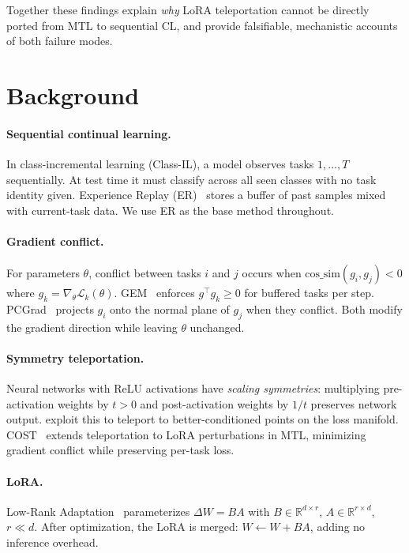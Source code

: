 \documentclass{article}
\newcommand{\cossim}{\mathrm{cos\_sim}}
\begin{document}
Together these findings explain \emph{why} LoRA teleportation cannot be directly ported
from MTL to sequential CL, and provide falsifiable, mechanistic accounts of both failure modes.

\section{Background}
\label{sec:background}

\paragraph{Sequential continual learning.}
In class-incremental learning (Class-IL), a model observes tasks $1, \ldots, T$ sequentially.
At test time it must classify across all seen classes with no task identity given.
Experience Replay (ER)~\citep{rolnick2019er} stores a buffer of past samples mixed with
current-task data. We use ER as the base method throughout.

\paragraph{Gradient conflict.}
For parameters $\theta$, conflict between tasks $i$ and $j$ occurs when
$\cossim(g_i, g_j) < 0$ where $g_k = \nabla_\theta \mathcal{L}_k(\theta)$.
GEM~\citep{lopezpaz2017gem} enforces $g^\top g_k \geq 0$ for buffered tasks per step.
PCGrad~\citep{yu2020pcgrad} projects $g_i$ onto the normal plane of $g_j$ when they conflict.
Both modify the gradient direction while leaving $\theta$ unchanged.

\paragraph{Symmetry teleportation.}
Neural networks with ReLU activations have \emph{scaling symmetries}: multiplying pre-activation
weights by $t > 0$ and post-activation weights by $1/t$ preserves network output.
\citet{zhao2022teleport} exploit this to teleport to better-conditioned points on the loss
manifold. COST~\citep{zhou2025cost} extends teleportation to LoRA perturbations in MTL,
minimizing gradient conflict while preserving per-task loss.

\paragraph{LoRA.}
Low-Rank Adaptation~\citep{hu2022lora} parameterizes $\Delta W = BA$ with
$B \in \mathbb{R}^{d \times r}$, $A \in \mathbb{R}^{r \times d}$, $r \ll d$.
After optimization, the LoRA is merged: $W \leftarrow W + BA$, adding no inference overhead.
\end{document}

